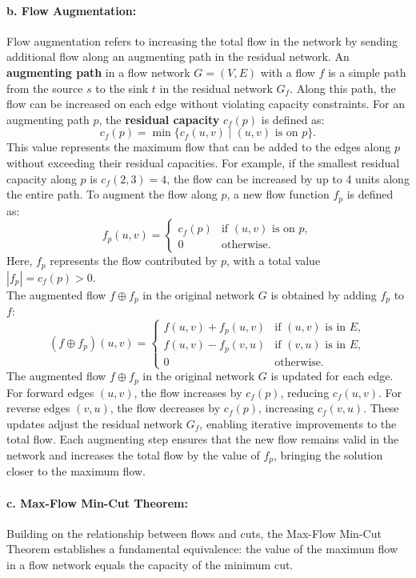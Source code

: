 \paragraph*{b. Flow Augmentation:} Flow augmentation refers to increasing the total flow in the network by sending additional flow along an augmenting path in the residual network. An \textbf{augmenting path} in a flow network $G = (V, E)$ with a flow $f$ is a simple path from the source $s$ to the sink $t$ in the residual network $G_f$. Along this path, the flow can be increased on each edge without violating capacity constraints. For an augmenting path $p$, the \textbf{residual capacity} $c_f(p)$ is defined as:
\[
c_f(p) = \min \{ c_f(u, v) \mid (u, v) \text{ is on } p \}.
\]
\noindent This value represents the maximum flow that can be added to the edges along $p$ without exceeding their residual capacities. For example, if the smallest residual capacity along $p$ is $c_f(2, 3) = 4$, the flow can be increased by up to 4 units along the entire path. To augment the flow along $p$, a new flow function $f_p$ is defined as:
\[
f_p(u, v) =
\begin{cases} 
c_f(p) & \text{if } (u, v) \text{ is on } p, \\
0 & \text{otherwise}.
\end{cases}
\]
Here, $f_p$ represents the flow contributed by $p$, with a total value $|f_p| = c_f(p) > 0$.\\

\noindent The augmented flow $f \oplus f_p$ in the original network $G$ is obtained by adding $f_p$ to $f$:
\[
(f \oplus f_p)(u, v) = 
\begin{cases} 
f(u, v) + f_p(u, v) & \text{if } (u, v) \text{ is in } E, \\
f(u, v) - f_p(v, u) & \text{if } (v, u) \text{ is in } E, \\
0 & \text{otherwise}.
\end{cases}
\]
The augmented flow $f \oplus f_p$ in the original network $G$ is updated for each edge. For forward edges $(u, v)$, the flow increases by $c_f(p)$, reducing $c_f(u, v)$. For reverse edges $(v, u)$, the flow decreases by $c_f(p)$, increasing $c_f(v, u)$. These updates adjust the residual network $G_f$, enabling iterative improvements to the total flow. Each augmenting step ensures that the new flow remains valid in the network and increases the total flow by the value of $f_p$, bringing the solution closer to the maximum flow. 


\paragraph*{c. Max-Flow Min-Cut Theorem:} Building on the relationship between flows and cuts, the Max-Flow Min-Cut Theorem establishes a fundamental equivalence: the value of the maximum flow in a flow network equals the capacity of the minimum cut.

